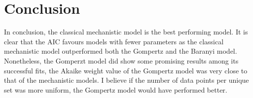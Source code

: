 \documentclass[11pt]{article}
\begin{document}
\section{Conclusion}
In conclusion, the classical mechanistic model is the best performing model. It is clear that the AIC favours models with fewer parameters as the classical mechanistic model outperformed both the Gompertz and the Baranyi model. Nonetheless, the Gomperzt model did show some promising results among its successful fits, the Akaike weight value of the Gompertz model was very close to that of the mechanistic models. I believe if the number of data points per unique set was more uniform, the Gompertz model would have performed better.

\newpage



\end{document}
